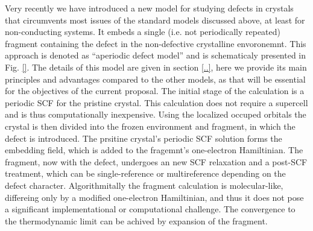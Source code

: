 \documentclass[a4paper,11pt,headings=normal]{scrartcl}
\begin{document}
Very recently we have introduced\cite{..} a new model for studying defects in crystals that circumvents most issues of the standard models discussed above, at least for non-conducting systems.  It embeds a single (i.e. not periodically repeated) fragment containing the defect in the non-defective crystalline envoronemnt. This approach is denoted as ``aperiodic defect model'' and is schematicaly presented in Fig. \ref{}. The details of this model are given in section \ref{..}, here we provide its main principles and advantages compared to the other models, as that will be essential for the objectives of the current proposal. The initial stage of the calculation is a periodic SCF for the pristine crystal. This calculation does not require a supercell and is thus computationally inexpensive. Using the localized occuped orbitals the crystal is then divided into the frozen environment and fragment, in which the defect is introduced. The prsitine crystal's periodic SCF solution forms the embedding field, which is added to the fragemnt's one-electron Hamiltinian. The fragment, now with the defect, undergoes an new SCF relaxation and a post-SCF treatment, which can be single-reference or multireference depending on the defect character. Algorithmitally the fragment calculation is molecular-like, differeing only by a modified one-electron Hamiltinian, and thus it does not pose a significant implementational or computational challenge. The convergence to the thermodynamic limit can be achived by expansion of the fragment.   
\end{document}
